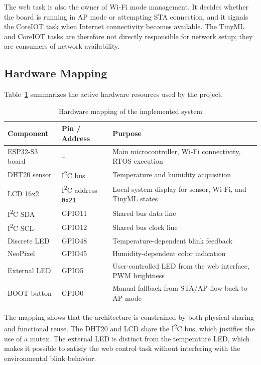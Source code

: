 The web task is also the owner of Wi-Fi mode management. It decides whether the
board is running in AP mode or attempting STA connection, and it signals the
CoreIOT task when Internet connectivity becomes available. The TinyML and
CoreIOT tasks are therefore not directly responsible for network setup; they
are consumers of network availability.

\subsection{Hardware Mapping}
Table~\ref{tab:hardware-mapping} summarizes the active hardware resources used
by the project.

\begin{table}[H]
\centering
\caption{Hardware mapping of the implemented system}
\label{tab:hardware-mapping}
\begin{tabular}{p{3.2cm}p{2.5cm}p{8.0cm}}
\toprule
\textbf{Component} & \textbf{Pin / Address} & \textbf{Purpose} \\
\midrule
ESP32-S3 board & -- & Main microcontroller, Wi-Fi connectivity, RTOS execution \\
DHT20 sensor & I\textsuperscript{2}C bus & Temperature and humidity acquisition \\
LCD 16x2 & I\textsuperscript{2}C address \texttt{0x21} & Local system display for sensor, Wi-Fi, and TinyML states \\
I\textsuperscript{2}C SDA & GPIO11 & Shared bus data line \\
I\textsuperscript{2}C SCL & GPIO12 & Shared bus clock line \\
Discrete LED & GPIO48 & Temperature-dependent blink feedback \\
NeoPixel & GPIO45 & Humidity-dependent color indication \\
External LED & GPIO5 & User-controlled LED from the web interface, PWM brightness \\
BOOT button & GPIO0 & Manual fallback from STA/AP flow back to AP mode \\
\bottomrule
\end{tabular}
\end{table}

The mapping shows that the architecture is constrained by both physical sharing
and functional reuse. The DHT20 and LCD share the I\textsuperscript{2}C bus,
which justifies the use of a mutex. The external LED is distinct from the
temperature LED, which makes it possible to satisfy the web control task
without interfering with the environmental blink behavior.

